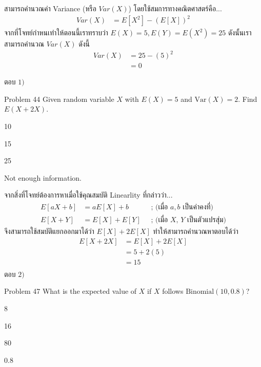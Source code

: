 \documentclass[11pt]{scrartcl}
\begin{document}
\begin{solutionbox}
  สามารถคำนวณค่า Variance (หรือ $Var(X)$) โดยใช้สมการทางคณิตศาสตร์คือ...
  \begin{align*}
    Var(X) &= E[X^2] - (E[X])^2
  \end{align*}
  จากที่โจทย์กำหนเทำให้ตอนนี้เราทราบว่า $E(X)=5, E(Y)=E(X^2)=25$ ดังนั้นเราสามารถคำนวณ $Var(X)$ ดังนี้
  \begin{align*}
    Var(X) &= 25 - (5)^2 \\
            &= 0
  \end{align*}

  ตอบ $\boxed{1)}$
\end{solutionbox}
 
\newpage

\begin{problembox}{Problem 44}
Given random variable $X$ with $E(X) = 5$ and $\text{Var}(X) = 2$. Find $E(X + 2X)$.
 
\begin{choices}
\item 10
\item 15
\item 25
\item Not enough information.
\end{choices}
\end{problembox}

\begin{solutionbox}
  จากสิ่งที่โจทย์ต้องการหาเมื่อใช้คุณสมบัติ Linearlity ที่กล่าวว่า...
  \begin{align*}
    E[aX+b] &= aE[X]+b &\; \text{ ; (เมื่อ $a, b$ เป็นค่าคงที่)} \\
    E[X+Y]  &= E[X] + E[Y] &\; \text{ ; (เมื่อ $X$, $Y$ เป็นตัวแปรสุ่ม)}
  \end{align*}
  จึงสามารถใช้สมบัติแยกออกมาได้ว่า $E[X] + 2E[X]$ ทำให้สามารถคำนวณหาตอบได้ว่า
  \begin{align*}
    E[X + 2X] &= E[X] + 2E[X] \\
              &= 5 + 2(5) \\
              &= 15 \\
  \end{align*}
  ตอบ $\boxed{2)}$
\end{solutionbox}

\begin{problembox}{Problem 47}
What is the expected value of $X$ if $X$ follows $\text{Binomial}(10, 0.8)$?
 
\begin{choices}
\item 8
\item 16
\item 80
\item 0.8
\end{choices}
\end{problembox}
 
\end{document}
